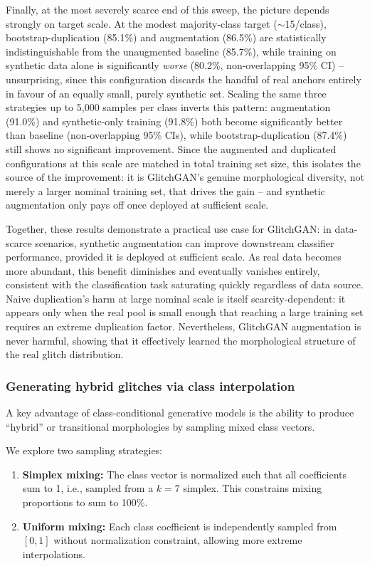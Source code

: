 \documentclass[reprint,nofootinbib,amsmath,amssymb,aps,floatfix]{revtex4-2}
\begin{document}
Finally, at the most severely scarce end of this sweep, the picture depends strongly on target scale. At the modest majority-class target ($\sim$15/class), bootstrap-duplication (85.1\%) and augmentation (86.5\%) are statistically indistinguishable from the unaugmented baseline (85.7\%), while training on synthetic data alone is significantly \emph{worse} (80.2\%, non-overlapping 95\% CI) -- unsurprising, since this configuration discards the handful of real anchors entirely in favour of an equally small, purely synthetic set. Scaling the same three strategies up to 5{,}000 samples per class inverts this pattern: augmentation (91.0\%) and synthetic-only training (91.8\%) both become significantly better than baseline (non-overlapping 95\% CIs), while bootstrap-duplication (87.4\%) still shows no significant improvement. Since the augmented and duplicated configurations at this scale are matched in total training set size, this isolates the source of the improvement: it is GlitchGAN's genuine morphological diversity, not merely a larger nominal training set, that drives the gain -- and synthetic augmentation only pays off once deployed at sufficient scale.

Together, these results demonstrate a practical use case for GlitchGAN: in data-scarce scenarios, synthetic augmentation can improve downstream classifier performance, provided it is deployed at sufficient scale. As real data becomes more abundant, this benefit diminishes and eventually vanishes entirely, consistent with the classification task saturating quickly regardless of data source. Naive duplication's harm at large nominal scale is itself scarcity-dependent: it appears only when the real pool is small enough that reaching a large training set requires an extreme duplication factor.
Nevertheless, GlitchGAN augmentation is never harmful, showing that it effectively learned the morphological structure of the real glitch distribution.

\subsubsection{Generating hybrid glitches via class interpolation}

A key advantage of class-conditional generative models is the ability to produce ``hybrid'' or transitional morphologies by sampling mixed class vectors.

We explore two sampling strategies:

\begin{enumerate}
\item
\textbf{Simplex mixing:} The class vector is normalized such that all coefficients sum to 1, i.e., sampled from a $k=7$ simplex. This constrains mixing proportions to sum to 100\%.

\item
\textbf{Uniform mixing:} Each class coefficient is independently sampled from $[0, 1]$ without normalization constraint, allowing more extreme interpolations.
\end{enumerate}
\end{document}
